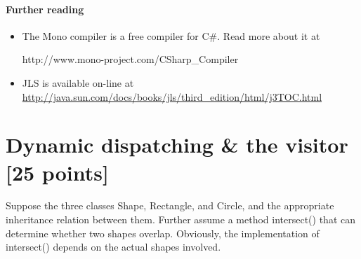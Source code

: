 \documentclass{article}
\newcommand{\jp}[1]{ \footnote{#1}}
\newcommand{\percent}[1]{\protect \marginpar[l]{\bf [#1 points]}}
\newcounter{question}
\newenvironment{question}[1]{%
  \addtocounter{question}{1}%
  \paragraph{Exercise~\arabic{question}  \percent{#1}}%
}{%
  \vskip1em%
}
\begin{document}

\paragraph{Further reading}
\begin{itemize}
\item The Mono compiler is a free compiler for C\#. Read more about it
at

\textsf{http://www.mono-project.com/CSharp\_Compiler}

\item JLS is available on-line at 
\url{http://java.sun.com/docs/books/jls/third_edition/html/j3TOC.html}

\end{itemize}

\newpage
\section{Dynamic dispatching \& the visitor [25 points]}

Suppose the three classes \textsf{Shape}, \textsf{Rectangle}, and 
\textsf{Circle}, and the appropriate inheritance relation between them.
Further assume a method \textsf{intersect()} that can determine whether two
shapes overlap. Obviously, the implementation of \textsf{intersect()} 
depends on the actual shapes involved. 
\end{document}
